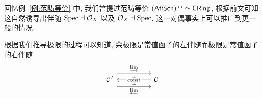 \begin{example}[代数-几何对偶]
    回忆例~\ref{例:范畴等价} 中, 我们曾提过范畴等价 $(\mathsf{AffSch})^{\operatorname{op}}\simeq \mathsf{CRing}$, 根据前文可知这自然诱导出伴随 $\operatorname{Spec} \dashv \mathcal{O}_X$ 以及 $\mathcal{O}_X \dashv \operatorname{Spec}$, 这一对偶事实上可以推广到更一般的情况.
\end{example}
\begin{example}
    根据我们推导极限的过程可以知道, 余极限是常值函子的左伴随而极限是常值函子的右伴随
    \[\begin{tikzcd}
	{\mathcal{C}^I} && {\mathcal{C}}
	\arrow[""{name=0, anchor=center, inner sep=0}, "\indlim", shift left=4, from=1-1, to=1-3]
	\arrow[""{name=1, anchor=center, inner sep=0}, "\prolim"', shift right=4, from=1-1, to=1-3]
	\arrow[""{name=2, anchor=center, inner sep=0}, "{\op{const}}"{description}, from=1-3, to=1-1]
	\arrow["\dashv"{anchor=center, rotate=-90}, draw=none, from=0, to=2]
	\arrow["\dashv"{anchor=center, rotate=-90}, draw=none, from=2, to=1]
    \end{tikzcd}\]
\end{example}
